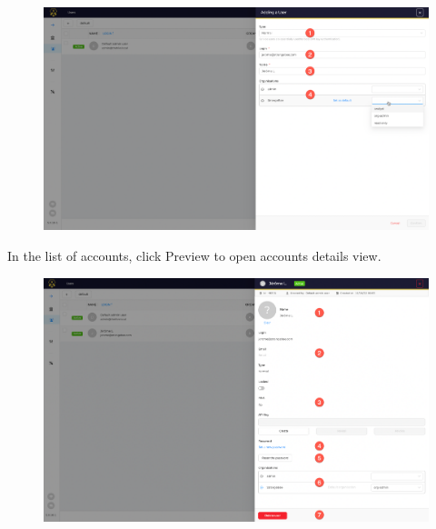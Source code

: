 \begin{figure}[H]
    \centering
    \includegraphics[width=\textwidth]{images/docs/org_admin/manage_users/accounts-2.png}
    \label{fig:modules}
\end{figure}
In the list of accounts, click Preview to open accounts details view.


\begin{figure}[H]
    \centering
    \includegraphics[width=\textwidth]{images/docs/org_admin/manage_users/accounts-3.png}
    \label{fig:modules}
\end{figure}


